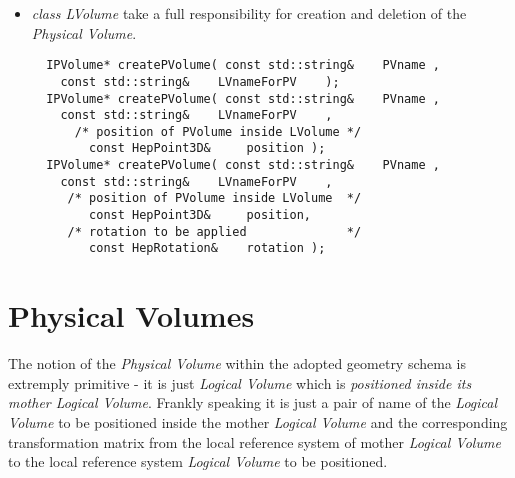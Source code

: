\begin{itemize}
\item 	
{\it class LVolume} take a full responsibility for creation and deletion of the {\it Physical Volume}. 
\begin{verbatim}
  IPVolume* createPVolume( const std::string&    PVname , 
	const std::string&    LVnameForPV    );
  IPVolume* createPVolume( const std::string&    PVname , 
	const std::string&    LVnameForPV    ,
      /* position of PVolume inside LVolume */ 
        const HepPoint3D&     position );      
  IPVolume* createPVolume( const std::string&    PVname , 
	const std::string&    LVnameForPV    ,
     /* position of PVolume inside LVolume  */
        const HepPoint3D&     position, 
     /* rotation to be applied              */
        const HepRotation&    rotation );    
\end{verbatim}


\end{itemize} 
 
\section{ Physical Volumes } 
The notion of the {\it Physical Volume} within the adopted geometry schema is 
extremply primitive - it is just {\it Logical Volume} which is {\it positioned 
inside its mother Logical Volume}.  Frankly speaking it is just a pair of 
name of the {\it Logical Volume} to be positioned inside the mother {\it Logical Volume } 
and the corresponding transformation matrix from the local reference system of mother 
{\it Logical Volume} to the local reference system {\it Logical Volume} to be positioned. 
 
